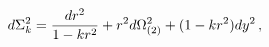 \begin{equation}\label{spacediff}
d\Sigma_k ^2 = {{dr^2} \over {1-kr^2}} + r^2 d\Omega_{(2)} ^2 +
(1-kr^2) dy^2 \, ,
\end{equation}

